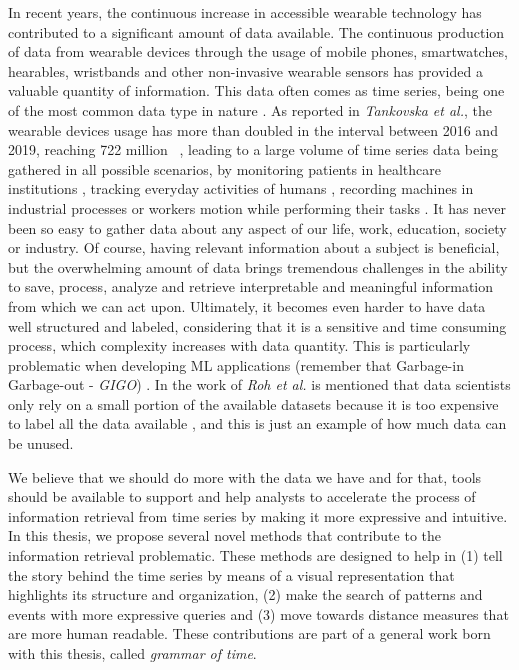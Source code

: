 In recent years, the continuous increase in accessible wearable technology has contributed to a significant amount of data available. The continuous production of data from wearable devices through the usage of mobile phones, smartwatches, hearables, wristbands and other non-invasive wearable sensors has provided a valuable quantity of information. This data often comes as time series, being one of the most common data type in nature \cite{puttinghuman}. As reported in \textit{Tankovska et al.}, the wearable devices usage has more than doubled in the interval between 2016 and 2019, reaching 722 million~\cite{tankovska_23_2020} \cite{novathesis-manual}, leading to a large volume of time series data being gathered in all possible scenarios, by monitoring patients in healthcare institutions \cite{cpd_medical_1, cpd_medical_2, cpd_medical_3, cpd_medical_4, dataset6, dataset7}, tracking everyday activities of humans \cite{cpd_har_1, cpd_har_2, review_1}, recording machines in industrial processes or workers motion while performing their tasks \cite{antonio, sara}. It has never been so easy to gather data about any aspect of our life, work, education, society or industry. Of course, having relevant information about a subject is beneficial, but the overwhelming amount of data  brings tremendous challenges in the ability to save, process, analyze and retrieve interpretable and meaningful information from which we can act upon\cite{bigdata}. Ultimately, it becomes even harder to have data well structured and labeled, considering that it is a sensitive and time consuming process, which complexity increases with data quantity. This is particularly problematic when developing \gls{ML} applications (remember that Garbage-in Garbage-out - \textit{GIGO}) \cite{roh2019survey}. In the work of \textit{Roh et al.} is mentioned that data scientists only rely on a small portion of the available datasets because it is too expensive to label all the data available \cite{roh2019survey}, and this is just an example of how much data can be unused. 

We believe that we should do more with the data we have and for that, tools should be available to support and help analysts to accelerate the process of information retrieval from time series by making it more expressive and intuitive. In this thesis, we propose several novel methods that contribute to the information retrieval problematic. These methods are designed to help in (1) tell the story behind the time series by means of a visual representation that highlights its structure and organization, (2) make the search of patterns and events with more expressive queries and (3) move towards distance measures that are more human readable. These contributions are part of a general work born with this thesis, called \textit{grammar of time}.

